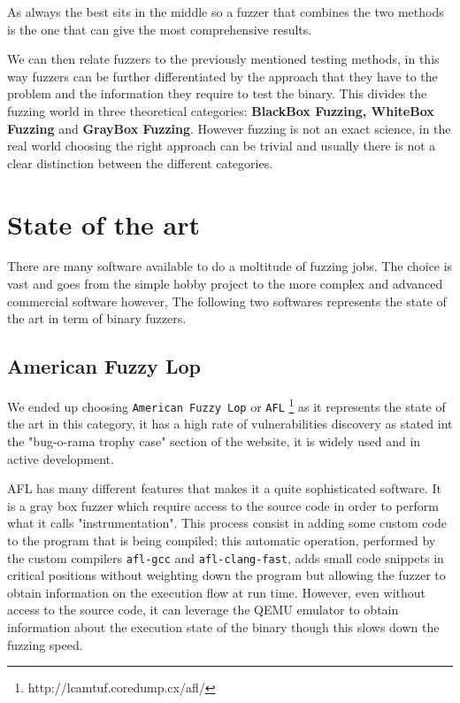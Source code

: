 \documentclass[../main.tex]{subfiles}
\begin{document}
As always the best sits in the middle so a fuzzer that combines the two methods is the one that can give the most comprehensive results.

We can then relate fuzzers to the previously mentioned testing methods, in this way fuzzers can be further differentiated by the approach that they have to
the problem and the information they require to test the binary. This divides
the fuzzing world in three theoretical categories: \textbf{BlackBox Fuzzing,
WhiteBox Fuzzing} and \textbf{GrayBox Fuzzing}. However fuzzing is not an exact
science, in the real world choosing the right approach can be trivial
and usually there is not a clear distinction between the different categories.


\section{State of the art}
There are many software available to do a moltitude of fuzzing jobs. The choice is vast and goes from the simple hobby project to the more complex and advanced commercial software however,  The following two softwares represents the state of the art in term of binary fuzzers.


\subsection{American Fuzzy Lop}

We ended up choosing \texttt{American Fuzzy Lop} or \texttt{AFL}
\footnote{http://lcamtuf.coredump.cx/afl/} as it represents the state of the art
in this category, it has a high rate of vulnerabilities discovery as stated int
the "bug-o-rama trophy case" section of the website, it is widely used and in
active development.

AFL has many different features that makes it a quite sophisticated software. It
is a gray box fuzzer which require access to the source code in order to perform
what it calls "instrumentation". This process consist in adding some custom code
to the program that is being compiled; this automatic operation, performed by
the custom compilers \texttt{afl-gcc} and \texttt{afl-clang-fast}, adds small
code snippets in critical positions without weighting down the program but
allowing the fuzzer to obtain information on the execution flow at run time.
However, even without access to the source code, it can leverage the QEMU
emulator to obtain information about the execution state of the binary though
this slows down the fuzzing speed.
\end{document}
